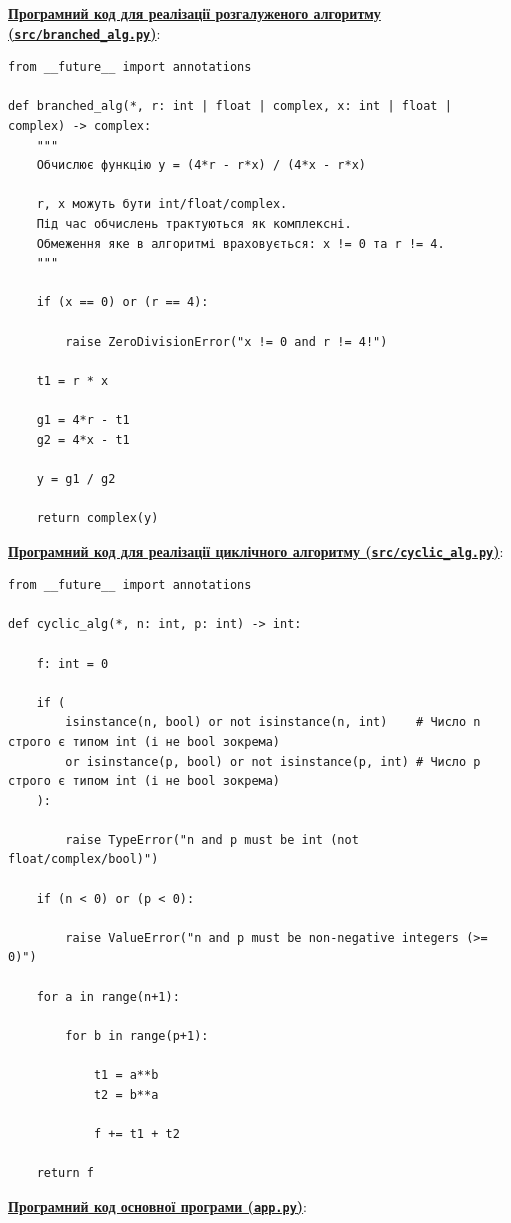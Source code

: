 \documentclass[12pt,a4paper]{article}
\begin{document}
    \noindent
    \textbf{\underline{Програмний код для реалізації розгалуженого алгоритму (\texttt{src/branched\_alg.py})}}:

    \begin{verbatim}
from __future__ import annotations

def branched_alg(*, r: int | float | complex, x: int | float | complex) -> complex:
    """
    Обчислює функцію y = (4*r - r*x) / (4*x - r*x)

    r, x можуть бути int/float/complex.
    Під час обчислень трактуються як комплексні.
    Обмеження яке в алгоритмі враховується: x != 0 та r != 4.
    """

    if (x == 0) or (r == 4):

        raise ZeroDivisionError("x != 0 and r != 4!")

    t1 = r * x

    g1 = 4*r - t1
    g2 = 4*x - t1

    y = g1 / g2

    return complex(y)
    \end{verbatim}

    \noindent
    \textbf{\underline{Програмний код для реалізації циклічного алгоритму (\texttt{src/cyclic\_alg.py})}}:

    \begin{verbatim}
from __future__ import annotations

def cyclic_alg(*, n: int, p: int) -> int:

    f: int = 0

    if (
        isinstance(n, bool) or not isinstance(n, int)    # Число n строго є типом int (і не bool зокрема)
        or isinstance(p, bool) or not isinstance(p, int) # Число p строго є типом int (і не bool зокрема)
    ):

        raise TypeError("n and p must be int (not float/complex/bool)")

    if (n < 0) or (p < 0):

        raise ValueError("n and p must be non-negative integers (>= 0)")

    for a in range(n+1):

        for b in range(p+1):

            t1 = a**b
            t2 = b**a

            f += t1 + t2

    return f
    \end{verbatim}

    \noindent
    \textbf{\underline{Програмний код основної програми (\texttt{app.py})}}:
\end{document}
